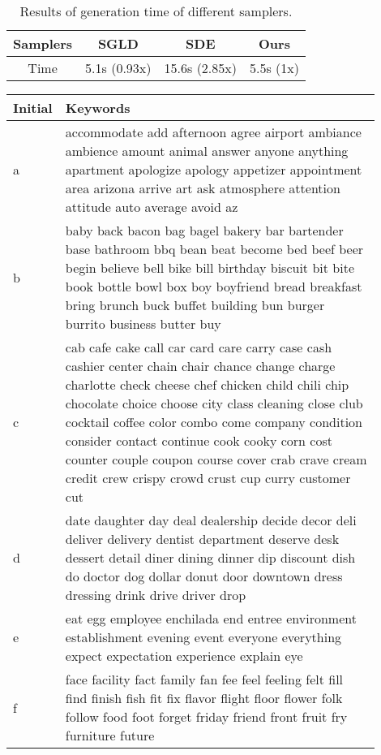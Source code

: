 \documentclass[11pt]{article}
\begin{document}
\begin{table}[ht]
\begin{table}[ht]
    \centering
    \begin{tabular}{cccc}
    \toprule
    Samplers & SGLD & SDE & Ours \\\midrule
    Time & 5.1s (0.93x) & 15.6s (2.85x) & 5.5s (1x)\\\bottomrule
    \end{tabular}
    \caption{Results of generation time of different samplers.}
    \label{tab:time_comsumed_sampler}
\end{table}

\begin{table}
\small
 \setlength\tabcolsep{3pt}
    \centering
    \begin{tabular}{p{0.05\linewidth}p{0.85\linewidth}}
    \toprule
    Initial & Keywords\\
    \midrule
    a & accommodate add afternoon agree airport ambiance ambience amount animal answer anyone anything apartment apologize apology appetizer appointment area arizona arrive art ask atmosphere attention attitude auto average avoid az \\
    \midrule
    b & baby back bacon bag bagel bakery bar bartender base bathroom bbq bean beat become bed beef beer begin believe bell bike bill birthday biscuit bit bite book bottle bowl box boy boyfriend bread breakfast bring brunch buck buffet building bun burger burrito business butter buy \\
    \midrule
    c & cab cafe cake call car card care carry case cash cashier center chain chair chance change charge charlotte check cheese chef chicken child chili chip chocolate choice choose city class cleaning close club cocktail coffee color combo come company condition consider contact continue cook cooky corn cost counter couple coupon course cover crab crave cream credit crew crispy crowd crust cup curry customer cut \\
    \midrule
    d & date daughter day deal dealership decide decor deli deliver delivery dentist department deserve desk dessert detail diner dining dinner dip discount dish do doctor dog dollar donut door downtown dress dressing drink drive driver drop \\
    \midrule
    e & eat egg employee enchilada end entree environment establishment evening event everyone everything expect expectation experience explain eye \\
    \midrule
    f & face facility fact family fan fee feel feeling felt fill find finish fish fit fix flavor flight floor flower folk follow food foot forget friday friend front fruit fry furniture future \\

\end{tabular}
\end{table}
\end{table}
\end{document}
